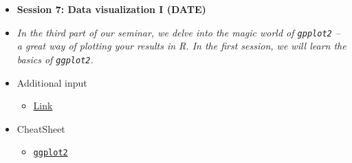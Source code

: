 \documentclass[12pt, a4paper]{article}
\begin{document}
\begin{itemize}
\item[] \textbf{Session 7: Data visualization I (DATE)} 
\item[]\textit{In the third part of our seminar, we delve into the magic world of \texttt{gpplot2} -- a great way of plotting your results in \textsf{R}. In the first session, we will learn the basics of \texttt{ggplot2}.}
{\color{darkgray}}
\item[] \faEdit \space Additional input
\begin{itemize} 
\item[$\square$] \href{url}{Link}
\end{itemize}
\item[] \faLightbulbO \space CheatSheet
\begin{itemize} 
\item[$\square$] \href{https://www.rstudio.com/wp-content/uploads/2015/03/ggplot2-cheatsheet.pdf}{\texttt{ggplot2}}
\end{itemize}


\end{itemize}
\end{document}

